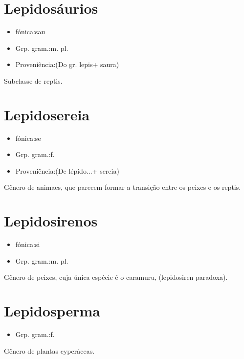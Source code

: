 \section{Lepidosáurios}
\begin{itemize}
\item {fónica:sau}
\end{itemize}
\begin{itemize}
\item {Grp. gram.:m. pl.}
\end{itemize}
\begin{itemize}
\item {Proveniência:(Do gr. \textunderscore lepis\textunderscore  + \textunderscore saura\textunderscore )}
\end{itemize}
Subclasse de reptis.
\section{Lepidosereia}
\begin{itemize}
\item {fónica:se}
\end{itemize}
\begin{itemize}
\item {Grp. gram.:f.}
\end{itemize}
\begin{itemize}
\item {Proveniência:(De \textunderscore lépido...\textunderscore  + \textunderscore sereia\textunderscore )}
\end{itemize}
Gênero de animaes, que parecem formar a transição entre os peixes e os reptis.
\section{Lepidosirenos}
\begin{itemize}
\item {fónica:si}
\end{itemize}
\begin{itemize}
\item {Grp. gram.:m. pl.}
\end{itemize}
Gênero de peixes, cuja única espécie é o caramuru, (\textunderscore lepidosiren paradoxa\textunderscore ).
\section{Lepidosperma}
\begin{itemize}
\item {Grp. gram.:f.}
\end{itemize}
Gênero de plantas cyperáceas.
